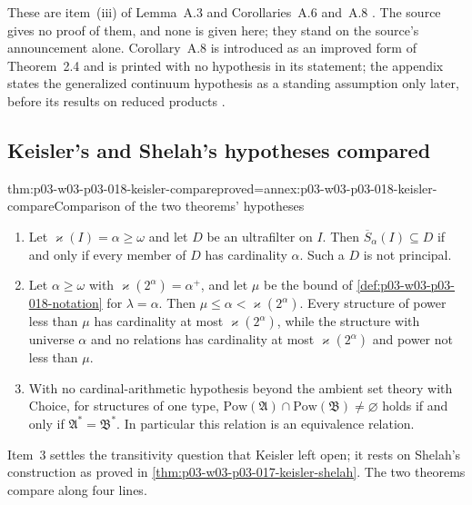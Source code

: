 These are item~(iii) of Lemma~A.3 \cite[491]{Keisler1961ElementaryClasses}
and Corollaries~A.6 and~A.8 \cite[492]{Keisler1961ElementaryClasses}.  The
source gives no proof of them, and none is given here; they stand on the
source's announcement alone.  Corollary~A.8 is introduced as an improved form
of Theorem~2.4 and is printed with no hypothesis in its statement; the
appendix states the generalized continuum hypothesis as a standing assumption
only later, before its results on reduced products
\cite[493]{Keisler1961ElementaryClasses}.

\subsection{Keisler's and Shelah's hypotheses compared}

\begin{hbtheorem}{thm:p03-w03-p03-018-keisler-compare}{proved=annex:p03-w03-p03-018-keisler-compare}{Comparison of the two theorems' hypotheses}
\begin{enumerate}
  \item Let \(\varkappa(I)=\alpha\ge\omega\) and let \(D\) be an ultrafilter
        on \(I\).  Then \(\overline S_\alpha(I)\subseteq D\) if and only if
        every member of \(D\) has cardinality \(\alpha\).  Such a \(D\) is
        not principal.
  \item Let \(\alpha\ge\omega\) with \(\varkappa(2^\alpha)=\alpha^+\), and let
        \(\mu\) be the bound of \cref{def:p03-w03-p03-018-notation} for
        \(\lambda=\alpha\).  Then \(\mu\le\alpha<\varkappa(2^\alpha)\).  Every
        structure of power less than \(\mu\) has cardinality at most
        \(\varkappa(2^\alpha)\), while the structure with universe \(\alpha\)
        and no relations has cardinality at most \(\varkappa(2^\alpha)\) and
        power not less than \(\mu\).
  \item With no cardinal-arithmetic hypothesis beyond the ambient set theory
        with Choice, for structures of one type,
        \(\mathrm{Pow}(\mathfrak A)\cap\mathrm{Pow}(\mathfrak B)\ne\varnothing\)
        holds if and only if \(\mathfrak A^*=\mathfrak B^*\).  In particular
        this relation is an equivalence relation.
\end{enumerate}
\end{hbtheorem}

Item~3 settles the transitivity question that Keisler left open; it rests on
Shelah's construction as proved in \cref{thm:p03-w03-p03-017-keisler-shelah}.
The two theorems compare along four lines.

